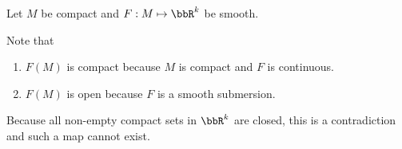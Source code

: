 Let $M$ be compact and $F:M\mapsto\bbR^k$ be smooth.

Note that
\begin{enumerate}[1.]
\item $F(M)$ is compact because $M$ is compact and $F$ is continuous.
\item $F(M)$ is open because $F$ is a smooth submersion.
\end{enumerate}

Because all non-empty compact sets in $\bbR^k$ are closed, this is a contradiction and such a map cannot exist.
